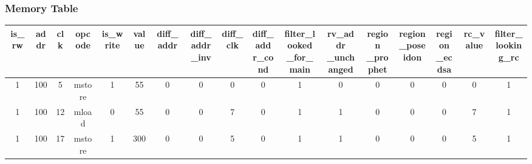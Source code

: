\subsubsection{Memory Table} \label{sec:memory-table}


\begin{table}[!ht]
    \begin{adjustwidth}{-1.75cm}{}
        \setlength{\tabcolsep}{2pt}
        \centering
        \begin{tabular}{|c|c|c|c|c|c|c|c|c|c|c|c|c|c|c|c|c|}
            \hline
            \rowcolor{gray} is\_rw     & addr   & clk   & opcode & is\_write & value & diff\_addr                     & \makecell{diff\_                                                                                                                                                                                                        \\addr\_inv} & diff\_clk & \makecell{diff\_add\\r\_cond} & \makecell{filter\_looked\\\_for\_main} & \makecell{rv\_addr\\\_unchanged} & \makecell{region\\\_prophet} & \makecell{region\\\_poseidon} & \makecell{region\\\_ecdsa} & rc\_value & \makecell{filter\_\\looking\_rc} \\
            \hline
            \rowcolor{green!20} 1      & 100    & 5     & mstore & 1         & 55    & \cellcolor{lightgray} 0        & \cellcolor{lightgray} 0     & \cellcolor{lightgray} 0     & \cellcolor{lightgray} 0 & \cellcolor{violet!30} 1     & 0     & \cellcolor{pink} 0     & \cellcolor{pink} 0     & \cellcolor{pink} 0     & 0        & 1     \\
            \hline
            \rowcolor{green!20} 1      & 100    & 12    & mload  & 0         & 55    & 0                              & 0                           & 7                           & \cellcolor{lightgray} 0 & \cellcolor{violet!30} 1     & 1     & \cellcolor{pink} 0     & \cellcolor{pink} 0     & \cellcolor{pink} 0     & 7        & 1     \\
            \hline
            \rowcolor{green!20} 1      & 100    & 17    & mstore & 1         & 300   & 0                              & 0                           & 5                           & \cellcolor{lightgray} 0 & \cellcolor{violet!30} 1     & 1     & \cellcolor{pink} 0     & \cellcolor{pink} 0     & \cellcolor{pink} 0     & 5        & 1     \\

\end{tabular}
\end{adjustwidth}
\end{table}
